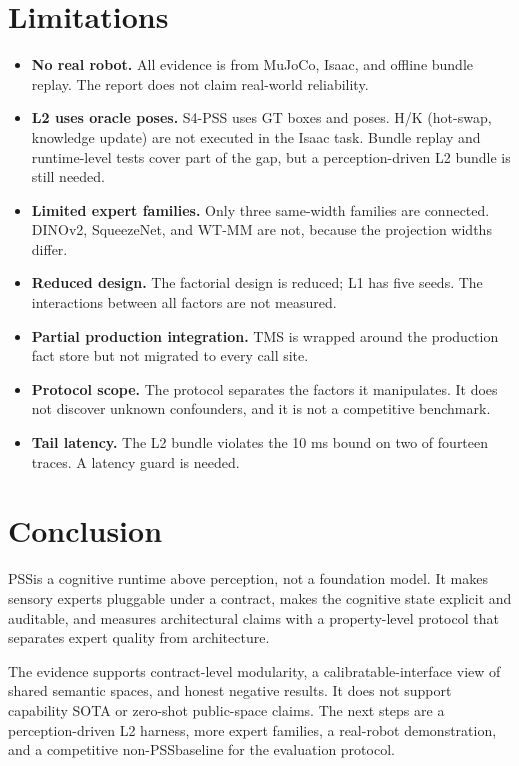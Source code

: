 \documentclass[10pt]{article}
\newcommand{\pss}{PSS}
\begin{document}
\section{Limitations}
\label{sec:limitations}

\begin{itemize}[leftmargin=*]
  \item \textbf{No real robot.} All evidence is from MuJoCo, Isaac, and offline
        bundle replay. The report does not claim real-world reliability.
  \item \textbf{L2 uses oracle poses.} S4-PSS uses GT boxes and poses. H/K
        (hot-swap, knowledge update) are not executed in the Isaac task. Bundle
        replay and runtime-level tests cover part of the gap, but a
        perception-driven L2 bundle is still needed.
  \item \textbf{Limited expert families.} Only three same-width families are
        connected. DINOv2, SqueezeNet, and WT-MM are not, because the projection
        widths differ.
  \item \textbf{Reduced design.} The factorial design is reduced; L1 has five
        seeds. The interactions between all factors are not measured.
  \item \textbf{Partial production integration.} TMS is wrapped around the
        production fact store but not migrated to every call site.
  \item \textbf{Protocol scope.} The protocol separates the factors it
        manipulates. It does not discover unknown confounders, and it is not a
        competitive benchmark.
  \item \textbf{Tail latency.} The L2 bundle violates the 10 ms bound on two of
        fourteen traces. A latency guard is needed.
\end{itemize}

\section{Conclusion}
\label{sec:conclusion}

\pss is a cognitive runtime above perception, not a foundation model. It makes
sensory experts pluggable under a contract, makes the cognitive state explicit
and auditable, and measures architectural claims with a property-level protocol
that separates expert quality from architecture.

The evidence supports contract-level modularity, a calibratable-interface view
of shared semantic spaces, and honest negative results. It does not support
capability SOTA or zero-shot public-space claims. The next steps are a
perception-driven L2 harness, more expert families, a real-robot demonstration,
and a competitive non-\pss baseline for the evaluation protocol.
\end{document}
